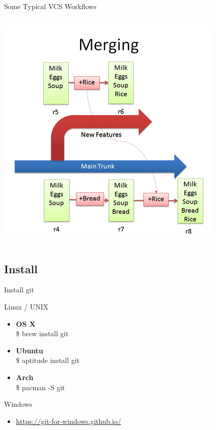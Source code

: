 \documentclass[10pt,xcolor=dvipsnames]{beamer}
\begin{document}
\begin{frame}{Some Typical VCS Workflows}
\begin{columns}
\pause
{\includegraphics [scale=0.28]{merging.png}}
\end{columns}
\end{frame}

\subsection{Install}

\begin{frame}{Install git}
\begin{block}{Linux / UNIX}
     \begin{itemize}
       \setlength\itemsep{0.2in}
       \item {\bf OS X}\\ \$ brew install git %
       \item {\bf Ubuntu}\\ \$ aptitude install git
       \item {\bf Arch}\\ \$ pacman -S git
     \end{itemize}
\end{block}

\begin{block}{Windows}
    \begin{itemize}
      \item \url{https://git-for-windows.github.io/}
    \end{itemize}
\end{block}
\end{frame}
\end{document}
